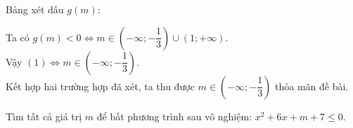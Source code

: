 \begin{bt}
{\begin{enumerate}[a)]
	Bảng xét dấu $g(m)$:
	\begin{center}
	\end{center}
	Ta có $g(m)<0 \Leftrightarrow m \in\left(-\infty;-\dfrac{1}{3}\right) \cup(1;+\infty)$.\\
	Vậy $(1) \Leftrightarrow m \in\left(-\infty;-\dfrac{1}{3}\right)$.\\
	 Kết hợp hai trường hợp đã xét, ta thu được
	  $m \in\left(-\infty;-\dfrac{1}{3}\right)$ thỏa mãn đề bài.
	\end{enumerate}
}
\end{bt}

\begin{bt}%
	Tìm tất cả giá trị $m$ để bất phương trình sau vô nghiệm: $x^2+6 x+m+7 \leq 0$.
\end{bt}

